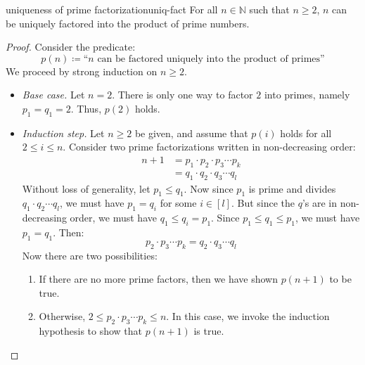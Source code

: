 \documentclass{article}
\theoremstyle{definition}
\begin{document}
\begin{theorem}{uniqueness of prime factorization}{uniq-fact}
  For all $n \in \mathbb{N}$ such that $n \ge 2$, $n$ can be uniquely factored
  into the product of prime numbers.
\end{theorem}
\begin{proof}
  Consider the predicate:
  \begin{equation*}
    p(n) \coloneqq \textrm{``$n$ can be factored uniquely into the product of
                              primes''}
  \end{equation*}
  We proceed by strong induction on $n \ge 2$.
  \begin{itemize}
    \item \textit{Base case.} Let $n=2$. There is only one way to factor $2$ 
      into primes, namely $p_1=q_1=2$. Thus, $p(2)$ holds.
    \item \textit{Induction step.} Let $n \ge 2$ be given, and assume that
      $p(i)$ holds for all $2 \le i \le n$. Consider two prime factorizations
      written in non-decreasing order:
      \begin{align*}
        n+1 &= p_1 \cdot p_2 \cdot p_3 \cdots p_k \\
            &= q_1 \cdot q_2 \cdot q_3 \cdots q_l
      \end{align*}
      Without loss of generality, let $p_1 \le q_1$. Now since $p_1$ is prime
      and divides $q_1 \cdot q_2 \cdots q_l$, we must have $p_1 = q_i$ for
      some $i \in [l]$. But since the $q$'s are in non-decreasing order, we must
      have $q_1 \le q_i = p_1$. Since $p_1 \le q_1 \le p_1$, we must have $p_1 =
      q_1$. Then:
      \begin{equation*}
        p_2 \cdot p_3 \cdots p_k = q_2 \cdot q_3 \cdots q_l
      \end{equation*}
      Now there are two possibilities:
      \begin{enumerate}
        \item If there are no more prime factors, then we have shown $p(n+1)$ to
          be true.
        \item Otherwise, $2 \le p_2 \cdot p_3 \cdots p_k \le n$. In this case,
          we invoke the induction hypothesis to show that $p(n+1)$ is true.
      \end{enumerate}
  \end{itemize}
\end{proof}
\end{document}
